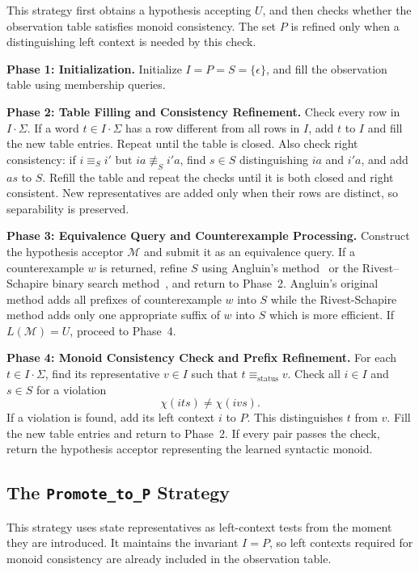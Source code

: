 \documentclass{ieice-tecrep}
\begin{document}
This strategy first obtains a hypothesis accepting \(U\), and then
checks whether the observation table satisfies monoid consistency.
The set \(P\) is refined only when a distinguishing left context is
needed by this check.

\textbf{Phase 1: Initialization.}
Initialize \(I=P=S=\{\epsilon\}\), and fill the observation table
using membership queries.

\textbf{Phase 2: Table Filling and Consistency Refinement.}
Check every row in \(I\cdot\Sigma\). If a word \(t\in I\cdot\Sigma\)
has a row different from all rows in \(I\), add \(t\) to \(I\) and
fill the new table entries. Repeat until the table is closed.
Also check right consistency: if \(i\equiv_S i'\) but
\(ia\not\equiv_S i'a\), find \(s\in S\) distinguishing \(ia\)
and \(i'a\), and add \(as\) to \(S\). Refill the table and repeat
the checks until it is both closed and right consistent.
New representatives are added only when their rows are distinct,
so separability is preserved.

\textbf{Phase 3: Equivalence Query and Counterexample Processing.}
Construct the hypothesis acceptor \(\mathcal{M}\) and submit it as an
equivalence query. If a counterexample \(w\) is returned, refine \(S\)
using Angluin's method~\cite{angluin87} or the Rivest--Schapire binary
search method~\cite{rivest1993inference}, and return to Phase~2. Angluin's original method adds all prefixes of counterexample \(w\) into
\(S\) while the Rivest-Schapire method adds only one appropriate suffix of \(w\) into \(S\) which is more efficient.
If \(L(\mathcal{M})=U\), proceed to Phase~4.

\textbf{Phase 4: Monoid Consistency Check and Prefix Refinement.}
For each \(t\in I\cdot\Sigma\), find its representative \(v\in I\)
such that \(t\equiv_{\mathrm{status}}v\). Check all \(i\in I\) and
\(s\in S\) for a violation
\[
\chi(its)\neq \chi(ivs).
\]
If a violation is found, add its left context \(i\) to \(P\).
This distinguishes \(t\) from \(v\). Fill the new table entries and
return to Phase~2. If every pair passes the check, return the
hypothesis acceptor representing the learned syntactic monoid.

\subsection{The \texttt{Promote\_to\_P} Strategy}\label{strategy-promote-to-p}

This strategy uses state representatives as left-context tests from
the moment they are introduced. It maintains the invariant
\(I = P\), so left contexts required for monoid consistency
are already included in the observation table.
\end{document}
